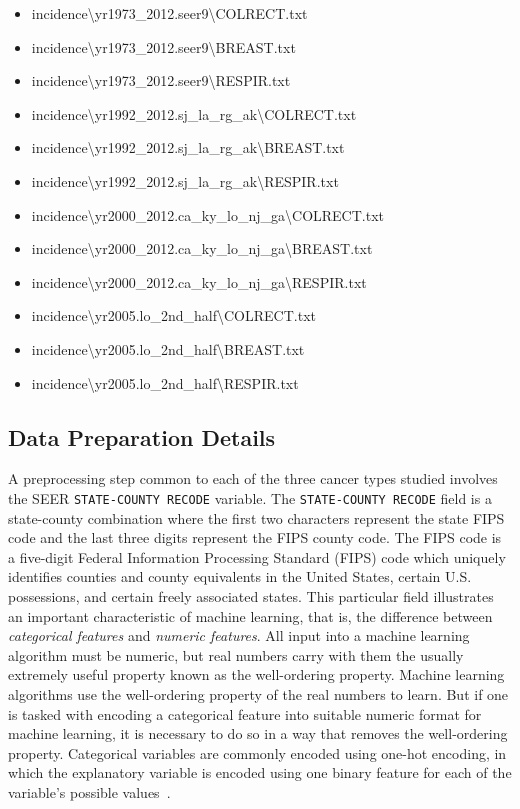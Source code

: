 \documentclass[10pt,letterpaper]{article}
\newcommand{\codewhite}[1]{\colorbox{white}{\texttt{#1}}}
\begin{document}
\begin{itemize}[noitemsep]
\item incidence\textbackslash yr1973\_2012.seer9\textbackslash COLRECT.txt
\item incidence\textbackslash yr1973\_2012.seer9\textbackslash BREAST.txt
\item incidence\textbackslash yr1973\_2012.seer9\textbackslash RESPIR.txt
\item incidence\textbackslash yr1992\_2012.sj\_la\_rg\_ak\textbackslash COLRECT.txt
\item incidence\textbackslash yr1992\_2012.sj\_la\_rg\_ak\textbackslash BREAST.txt
\item incidence\textbackslash yr1992\_2012.sj\_la\_rg\_ak\textbackslash RESPIR.txt
\item incidence\textbackslash yr2000\_2012.ca\_ky\_lo\_nj\_ga\textbackslash COLRECT.txt
\item incidence\textbackslash yr2000\_2012.ca\_ky\_lo\_nj\_ga\textbackslash BREAST.txt
\item incidence\textbackslash yr2000\_2012.ca\_ky\_lo\_nj\_ga\textbackslash RESPIR.txt
\item incidence\textbackslash yr2005.lo\_2nd\_half\textbackslash COLRECT.txt
\item incidence\textbackslash yr2005.lo\_2nd\_half\textbackslash BREAST.txt
\item incidence\textbackslash yr2005.lo\_2nd\_half\textbackslash RESPIR.txt
\end{itemize}

\subsection*{Data Preparation Details}
\label{sec:munge}

A preprocessing step common to each of the three cancer types studied involves the SEER \codewhite{STATE-COUNTY RECODE} variable.
The \codewhite{STATE-COUNTY RECODE} field is a state-county combination where the first two characters represent the state FIPS code and the last three digits represent the FIPS county code.  The FIPS code is a five-digit Federal Information Processing Standard (FIPS) code which uniquely identifies counties and county equivalents in the United States, certain U.S. possessions, and certain freely associated states.
This particular field illustrates an important characteristic of machine learning, that is, the difference  between \textit{categorical features} and \textit{numeric features}. All input into a machine learning algorithm must be numeric, but real numbers carry with them the usually extremely useful property known as the well-ordering property. Machine learning algorithms use the well-ordering property of the real numbers to learn.
But if one is tasked with encoding a categorical feature into suitable numeric format for machine learning, it is necessary to do so in a way that removes the well-ordering property. Categorical variables are commonly encoded using one-hot encoding, in which the explanatory variable is encoded using one binary feature for each of the variable's possible values~\cite{bowles}.
\end{document}
